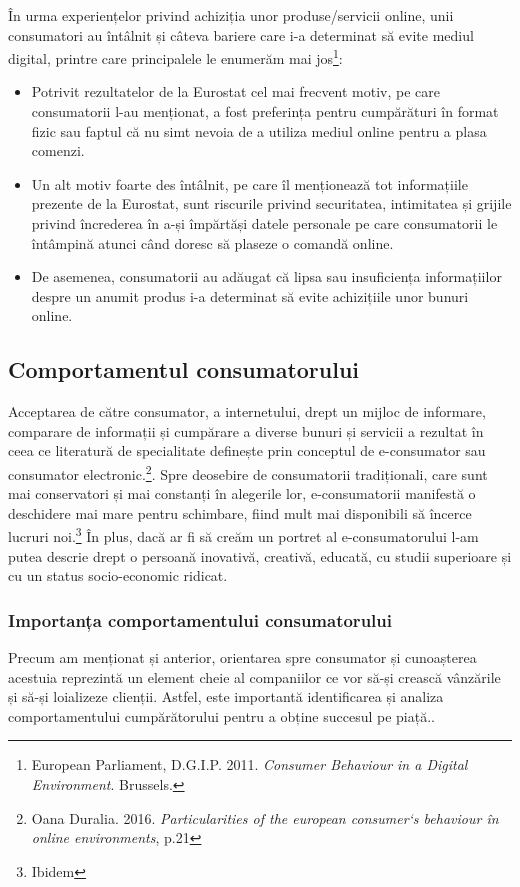 \documentclass[a4paper, 12pt]{article}
\begin{document}
	\quad În urma experiențelor privind achiziția unor produse/servicii online, unii consumatori au întâlnit și câteva bariere care i-a determinat să evite mediul digital, printre care principalele le enumerăm mai jos\footnote{European Parliament, D.G.I.P. 2011. \textit{Consumer Behaviour in a Digital Environment}. Brussels.}:
	\begin{itemize}
	\item Potrivit rezultatelor de la Eurostat cel mai frecvent motiv, pe care consumatorii l-au menționat, a fost preferința pentru cumpărături în format fizic sau faptul că nu simt nevoia de a utiliza mediul online pentru a plasa comenzi.
	\item Un alt motiv foarte des întâlnit, pe care îl menționează tot informațiile prezente de la Eurostat, sunt riscurile privind securitatea, intimitatea și grijile privind încrederea în a-și împărtăși datele personale pe care consumatorii le întâmpină atunci când doresc să plaseze o comandă online.
	\item De asemenea, consumatorii au adăugat că lipsa sau insuficiența informațiilor despre un anumit produs i-a determinat să evite achizițiile unor bunuri online.	
	\end{itemize}
\newpage
		\subsection{Comportamentul consumatorului}	
		\quad Acceptarea de către consumator, a internetului, drept un mijloc de informare, comparare de informații  și cumpărare a diverse bunuri și servicii a rezultat în ceea ce literatură de specialitate definește prin conceptul de e-consumator sau consumator electronic.\footnote{Oana Duralia. 2016. \textit{Particularities of the european consumer`s behaviour în online environments}, p.21}.  Spre deosebire de consumatorii tradiționali, care sunt mai conservatori și mai constanți în alegerile lor, e-consumatorii manifestă o deschidere mai mare pentru schimbare, fiind mult mai disponibili să încerce lucruri noi.\footnote{Ibidem} În plus, dacă ar fi să creăm un portret al e-consumatorului l-am putea descrie drept o persoană inovativă, creativă, educată, cu studii superioare și cu un status socio-economic ridicat.
			\subsubsection{Importanța comportamentului consumatorului }
		\qquad\space Precum am menționat și anterior, orientarea spre consumator și cunoașterea acestuia reprezintă un element cheie al companiilor ce vor să-și crească vânzările și să-și loializeze clienții. Astfel, este importantă identificarea și analiza comportamentului cumpărătorului pentru a obține succesul pe piață..
		
\end{document}
